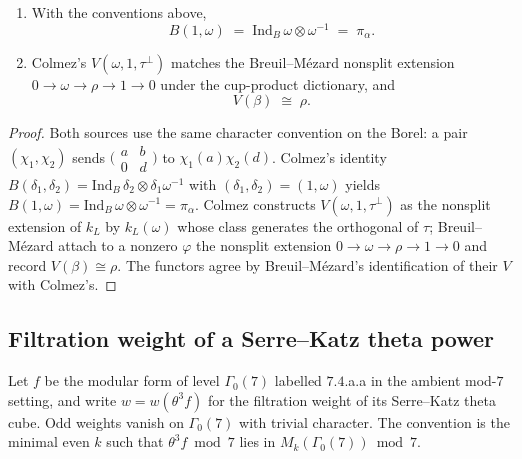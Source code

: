 \begin{theorem}\label{thm:colmez-d12}
\begin{enumerate}
\item With the conventions above,
\[
B(1,\omega)\;=\;\mathrm{Ind}_B\,\omega\otimes\omega^{-1}\;=\;\pi_\alpha.
\]
\item Colmez's $V(\omega,1,\tau^\perp)$ matches the Breuil--M\'ezard nonsplit extension $0\to\omega\to\rho\to1\to0$ under the cup-product dictionary, and
\[
V(\beta)\;\cong\;\rho.
\]
\end{enumerate}
\end{theorem}
\begin{proof}
Both sources use the same character convention on the Borel: a pair $(\chi_1,\chi_2)$ sends $\bigl(\begin{smallmatrix}a&b\\0&d\end{smallmatrix}\bigr)$ to $\chi_1(a)\chi_2(d)$. Colmez's identity $B(\delta_1,\delta_2)=\mathrm{Ind}_B\,\delta_2\otimes\delta_1\omega^{-1}$ with $(\delta_1,\delta_2)=(1,\omega)$ yields $B(1,\omega)=\mathrm{Ind}_B\,\omega\otimes\omega^{-1}=\pi_\alpha$. Colmez constructs $V(\omega,1,\tau^\perp)$ as the nonsplit extension of $k_L$ by $k_L(\omega)$ whose class generates the orthogonal of $\tau$; Breuil--M\'ezard attach to a nonzero $\varphi$ the nonsplit extension $0\to\omega\to\rho\to1\to0$ and record $V(\beta)\cong\rho$. The functors agree by Breuil--M\'ezard's identification of their $V$ with Colmez's.
\end{proof}

\subsection{Filtration weight of a Serre--Katz theta power}
Let $f$ be the modular form of level $\Gamma_0(7)$ labelled $7.4$.a.a in the ambient mod-$7$ setting, and write $w=w(\theta^3 f)$ for the filtration weight of its Serre--Katz theta cube. Odd weights vanish on $\Gamma_0(7)$ with trivial character. The convention is the minimal even $k$ such that $\theta^3 f\bmod 7$ lies in $M_k(\Gamma_0(7))\bmod 7$.

